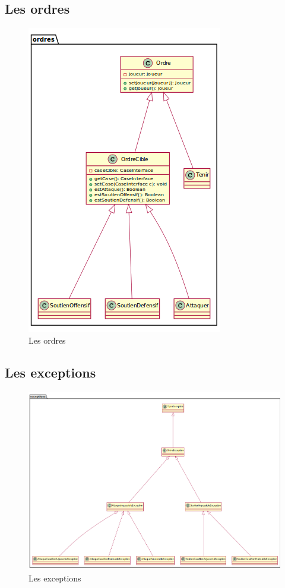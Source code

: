 \subsection{Les ordres}
	\begin{figure}[!h]
		\centering
		\includegraphics[scale=0.5]{images/DCP2.png}
		\caption{Les ordres}
	\end{figure}

\subsection{Les exceptions}
	\vspace{10mm}
	\begin{figure}[!h]
		\centering
		\includegraphics[scale=0.3]{images/DCP3.png}
		\caption{Les exceptions}
	\end{figure}
\newpage
